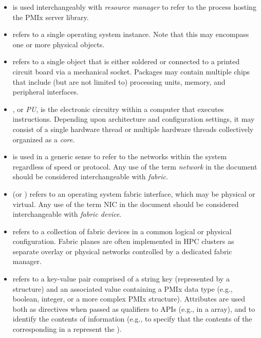\begin{itemize}
\item {} is used interchangeably with \emph{resource manager} to refer to the process hosting the \ac{PMIx} server library.

\item {} refers to a single operating system instance. Note that this may encompass one or more physical objects.

\item {} refers to a single object that is either soldered or connected to a printed circuit board via a mechanical socket. Packages may contain multiple chips that include (but are not limited to) processing units, memory, and peripheral interfaces.

\item {}, or \emph{PU}, is the electronic circuitry within a computer that executes instructions. Depending upon architecture and configuration settings, it may consist of a single hardware thread or multiple hardware threads collectively organized as a \emph{core}.

\item {} is used in a generic sense to refer to the networks within the system regardless of speed or protocol. Any use of the term \emph{network} in the document should be considered interchangeable with \emph{fabric}.

\item {} (or ) refers to an operating system fabric interface, which may be physical or virtual. Any use of the term \ac{NIC} in the document should be considered interchangeable with \emph{fabric device}.

\item {} refers to a collection of fabric devices in a common logical or physical configuration. Fabric planes are often implemented in \ac{HPC} clusters as separate overlay or physical networks controlled by a dedicated fabric manager.

\item {} refers to a key-value pair comprised of a string key (represented by a  structure) and an associated value containing a \ac{PMIx} data type (e.g., boolean, integer, or a more complex \ac{PMIx} structure). Attributes are used both as directives when passed as qualifiers to \acp{API} (e.g., in a  array), and to identify the contents of information (e.g., to specify that the contents of the corresponding  in a  represent the ).


\end{itemize}

